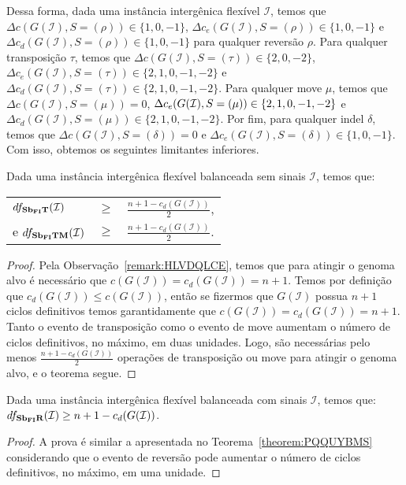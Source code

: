 Dessa forma, dada uma instância intergênica flexível $\mathcal{I}$, temos que $\Delta c(G(\mathcal{I}), S=(\rho)) \in \{1,0,-1\}$, $\Delta c_e(G(\mathcal{I}), S=(\rho)) \in \{1,0,-1\}$ e $\Delta c_d(G(\mathcal{I}), S=(\rho)) \in \{1,0,-1\}$ para qualquer reversão $\rho$. Para qualquer transposição $\tau$, temos que $\Delta c(G(\mathcal{I}), S=(\tau)) \in \{2,0,-2\}$, $\Delta c_e(G(\mathcal{I}), S=(\tau)) \in \{2,1,0,-1,-2\}$ e $\Delta c_d(G(\mathcal{I}), S=(\tau)) \in \{2,1,0,-1,-2\}$. Para qualquer move $\mu$, temos que $\Delta c(G(\mathcal{I}), S=(\mu)) = 0$, $\Delta c_e(G(\mathcal{I}), S=(\mu)) \in \{2,1,0,-1,\break-2\}$ e $\Delta c_d(G(\mathcal{I}), S=(\mu)) \in \{2,1,0,-1,-2\}$. Por fim, para qualquer indel $\delta$, temos que $\Delta c(G(\mathcal{I}), S=(\delta)) = 0$ e $\Delta c_e(G(\mathcal{I}), S=(\delta)) \in \{1,0,{-1}\}$. Com isso, obtemos os seguintes limitantes inferiores.

\begin{theorem}\label{theorem:PQQUYBMS}
Dada uma instância intergênica flexível balanceada sem sinais $\mathcal{I}$, temos que:

\begin{tabular}{lll}
  $df_{\textbf{Sb\textsubscript{FI}T}}(\mathcal{I})$      & $ \ge $ & $\frac{{n+1} - c_d(G(\mathcal{I} ))}{2}$, \\
  e $df_{\textbf{Sb\textsubscript{FI}TM}}(\mathcal{I})$   & $ \ge $ & $\frac{{n+1} - c_d(G(\mathcal{I} ))}{2}$. \\
\end{tabular}
\end{theorem}
\begin{proof}
Pela Observação~\ref{remark:HLVDQLCE}, temos que para atingir o genoma alvo é necessário que $c(G(\mathcal{I})) = c_d(G(\mathcal{I})) = n+1$. Temos por definição que $c_d(G(\mathcal{I})) \le c(G(\mathcal{I}))$, então se fizermos que $G(\mathcal{I})$ possua $n+1$ ciclos definitivos temos garantidamente que $c(G(\mathcal{I})) = c_d(G(\mathcal{I})) = n+1$. Tanto o evento de transposição como o evento de move aumentam o número de ciclos definitivos, no máximo, em duas unidades. Logo, são necessárias pelo menos $\frac{{n+1} - c_d(G(\mathcal{I} ))}{2}$ operações de transposição ou move para atingir o genoma alvo, e o teorema segue. 
\end{proof}

\begin{theorem}\label{theorem:EUNBEQEX}
Dada uma instância intergênica flexível balanceada com sinais $\mathcal{I}$, temos que: $df_{\textbf{Sb\textsubscript{FI}R}}(\mathcal{I}) \ge {n+1} - c_d(G(\mathcal{I} ))$.
\end{theorem}
\begin{proof}
A prova é similar a apresentada no Teorema~\ref{theorem:PQQUYBMS} considerando que o evento de reversão pode aumentar o número de ciclos definitivos, no máximo, em uma unidade.
\end{proof}

